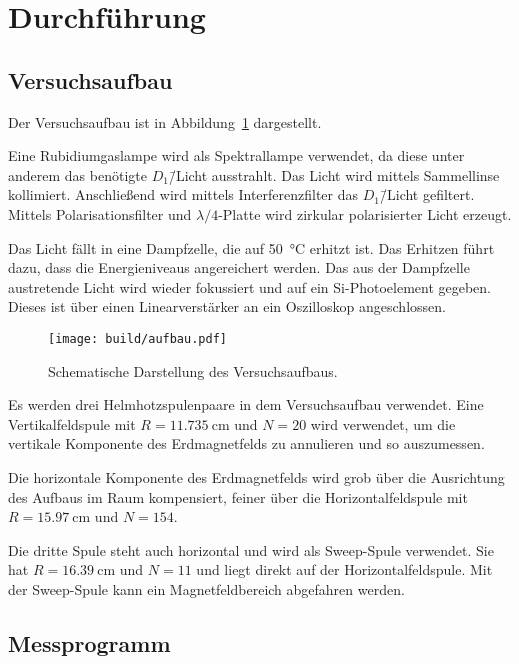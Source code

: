 \section{Durchführung}%
\label{sec:durchfuehrung}

\subsection{Versuchsaufbau}%
\label{sub:versuchsaufbau}

Der Versuchsaufbau ist in Abbildung~\ref{fig:aufbau} dargestellt.

Eine Rubidiumgaslampe wird als Spektrallampe verwendet, da diese
unter anderem das benötigte $D_1$\=/Licht ausstrahlt.
Das Licht wird mittels Sammellinse kollimiert.
Anschließend wird mittels Interferenzfilter das $D_1$\=/Licht gefiltert.
Mittels Polarisationsfilter und $\lambda/4$-Platte wird zirkular polarisierter
Licht erzeugt.

Das Licht fällt in eine Dampfzelle, die auf \SI{50}{\celsius} erhitzt ist.
Das Erhitzen führt dazu, dass die Energieniveaus angereichert werden.
Das aus der Dampfzelle austretende Licht wird wieder fokussiert und auf ein
Si-Photoelement gegeben.
Dieses ist über einen Linearverstärker an ein Oszilloskop angeschlossen.

\begin{figure}[ht]
  \centering
  \texttt{[image: build/aufbau.pdf]}
  \caption{Schematische Darstellung des Versuchsaufbaus. \cite{anleitung}}
  \label{fig:aufbau}
\end{figure}

Es werden drei Helmhotzspulenpaare in dem Versuchsaufbau verwendet.
Eine Vertikalfeldspule mit
$R = \SI{11.735}{\centi\meter}$ und $N = \num{20}$
wird verwendet, um die vertikale Komponente des Erdmagnetfelds zu annulieren
und so auszumessen.

Die horizontale Komponente des Erdmagnetfelds wird grob über die Ausrichtung
des Aufbaus im Raum kompensiert,
feiner über die Horizontalfeldspule mit
$R = \SI{15.97}{\centi\meter}$ und $N = \num{154}$.

Die dritte Spule steht auch horizontal und wird als Sweep-Spule verwendet.
Sie hat
$R = \SI{16.39}{\centi\meter}$ und $N = \num{11}$
und liegt direkt auf der Horizontalfeldspule.
Mit der Sweep-Spule kann ein Magnetfeldbereich abgefahren werden.


\subsection{Messprogramm}%
\label{sub:messprogramm}

